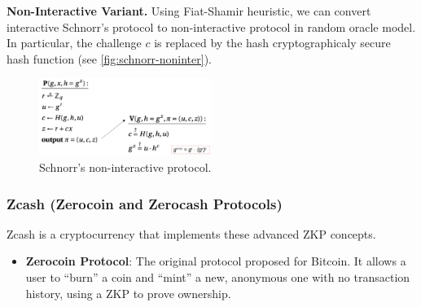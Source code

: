 \medskip
\textbf{Non-Interactive Variant.} 
Using Fiat-Shamir heuristic, we can convert interactive Schnorr's protocol to non-interactive protocol in random oracle model. 
In particular, the challenge $c$ is replaced by the hash cryptographicaly secure hash function (see \autoref{fig:schnorr-noninter}).
\begin{figure}[h]
	\begin{center}
		\includegraphics[width=0.5\textwidth]{./figs/schnor-noninter.png}
		\caption{Schnorr's non-interactive protocol.}		
		\label{fig:schnorr-noninter}
	\end{center}	
\end{figure}





\subsubsection{Zcash (Zerocoin and Zerocash
Protocols)}\label{zcash-zerocoin-and-zerocash-protocols}

Zcash is a cryptocurrency that implements these advanced ZKP concepts.


\begin{itemize}
\tightlist
\item
  \textbf{Zerocoin Protocol}: The original protocol proposed for
  Bitcoin. It allows a user to ``burn'' a coin and ``mint'' a new,
  anonymous one with no transaction history, using a ZKP to prove
  ownership.
\end{itemize}


